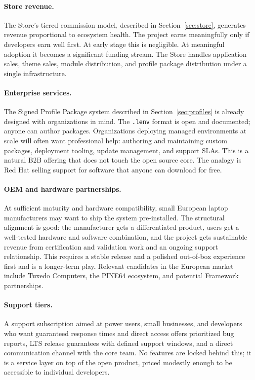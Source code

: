 \paragraph{Store revenue.}
The Store's tiered commission model, described in Section~\ref{sec:store},
generates revenue proportional to ecosystem health. The project earns
meaningfully only if developers earn well first. At early stage this is
negligible. At meaningful adoption it becomes a significant funding stream. The
Store handles application sales, theme sales, module distribution, and profile
package distribution under a single infrastructure.

\paragraph{Enterprise services.}
The Signed Profile Package system described in Section~\ref{sec:profiles} is
already designed with organizations in mind. The \texttt{.lenv} format is open
and documented; anyone can author packages. Organizations deploying managed
environments at scale will often want professional help: authoring and
maintaining custom packages, deployment tooling, update management, and support
SLAs. This is a natural B2B offering that does not touch the open source core.
The analogy is Red Hat selling support for software that anyone can download
for free.

\paragraph{OEM and hardware partnerships.}
At sufficient maturity and hardware compatibility, small European laptop
manufacturers may want to ship the system pre-installed. The structural
alignment is good: the manufacturer gets a differentiated product, users get a
well-tested hardware and software combination, and the project gets sustainable
revenue from certification and validation work and an ongoing support
relationship. This requires a stable release and a polished out-of-box
experience first and is a longer-term play. Relevant candidates in the European
market include Tuxedo Computers, the PINE64 ecosystem, and potential Framework
partnerships.

\paragraph{Support tiers.}
A support subscription aimed at power users, small businesses, and developers
who want guaranteed response times and direct access offers prioritized bug
reports, LTS release guarantees with defined support windows, and a direct
communication channel with the core team. No features are locked behind this;
it is a service layer on top of the open product, priced modestly enough to be
accessible to individual developers.

